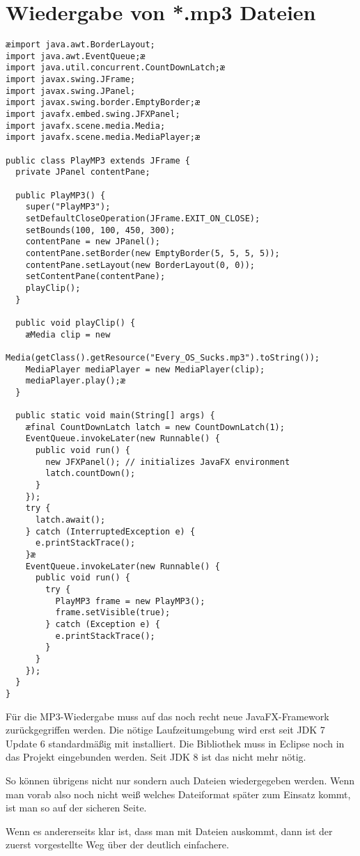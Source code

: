 \begin{minipage}{1.0\textwidth}
\section{Wiedergabe von *.mp3 Dateien}

\begin{lstlisting}
æimport java.awt.BorderLayout;
import java.awt.EventQueue;æ
import java.util.concurrent.CountDownLatch;æ
import javax.swing.JFrame;
import javax.swing.JPanel;
import javax.swing.border.EmptyBorder;æ
import javafx.embed.swing.JFXPanel;
import javafx.scene.media.Media;
import javafx.scene.media.MediaPlayer;æ

public class PlayMP3 extends JFrame {
  private JPanel contentPane;

  public PlayMP3() {
    super("PlayMP3");
    setDefaultCloseOperation(JFrame.EXIT_ON_CLOSE);
    setBounds(100, 100, 450, 300);
    contentPane = new JPanel();
    contentPane.setBorder(new EmptyBorder(5, 5, 5, 5));
    contentPane.setLayout(new BorderLayout(0, 0));
    setContentPane(contentPane);
    playClip();
  }

  public void playClip() {
    æMedia clip = new
         Media(getClass().getResource("Every_OS_Sucks.mp3").toString());
    MediaPlayer mediaPlayer = new MediaPlayer(clip);
    mediaPlayer.play();æ
  }

  public static void main(String[] args) {
    æfinal CountDownLatch latch = new CountDownLatch(1);
    EventQueue.invokeLater(new Runnable() {
      public void run() {
        new JFXPanel(); // initializes JavaFX environment
        latch.countDown();
      }
    });
    try {
      latch.await();
    } catch (InterruptedException e) {
      e.printStackTrace();
    }æ
    EventQueue.invokeLater(new Runnable() {
      public void run() {
        try {
          PlayMP3 frame = new PlayMP3();
          frame.setVisible(true);
        } catch (Exception e) {
          e.printStackTrace();
        }
      }
    });
  }
}
\end{lstlisting}
\end{minipage}


Für die MP3-Wiedergabe muss auf das noch recht neue JavaFX-Framework
zurückgegriffen werden. Die nötige Laufzeitumgebung wird erst seit JDK 7 Update
6 standardmäßig mit installiert. Die Bibliothek  muss in
Eclipse noch in das Projekt eingebunden werden. Seit JDK 8 ist das nicht mehr
nötig.

So können übrigens nicht nur  sondern auch  Dateien
wiedergegeben werden. Wenn man vorab also noch nicht weiß welches Dateiformat
später zum Einsatz kommt, ist man so auf der sicheren Seite.

Wenn es andererseits klar ist, dass man mit  Dateien auskommt,
dann ist der zuerst vorgestellte Weg über  der deutlich
einfachere.
